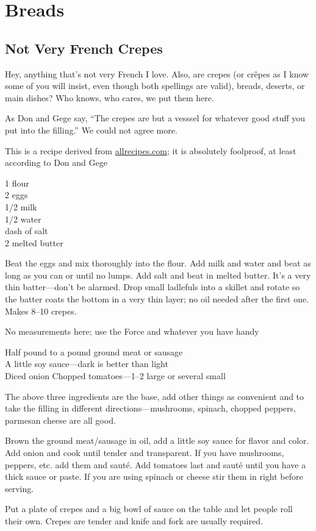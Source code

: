 \chapter{Breads}

\section{Not Very French Crepes}

\begin{open}
    Hey, anything that's not very French I love.  Also, are crepes (or
    cr\^{e}pes as I know some of you will insist, even though both spellings are
    valid), breads, deserts, or main dishes?  Who knows, who cares, we put them
    here.

    As Don and Gege say, ``The crepes are but a vesssel for whatever good stuff
    you put into the filling.''  We could not agree more.

    This is a recipe derived from \url{allrecipes.com}; it is absolutely
    foolproof, at least according to Don and Gege
\end{open}
\begin{ingredients}
    \SI{1}{\cup} flour\\
    2 eggs\\
    \SI{1/2}{\cup} milk\\
    \SI{1/2}{\cup} water\\
    dash of salt\\
    \SI{2}{\tblspoon} melted butter\\
\end{ingredients}
Beat the eggs and mix thoroughly into the flour. Add milk and water and beat as
long as you can or until no lumps. Add salt and beat in melted butter. It's a
very thin batter---don't be alarmed. Drop small ladlefuls into a skillet and
rotate so the batter coats the bottom in a very thin layer; no oil needed after
the first one. Makes \numrange{8}{10} crepes.


\noindent No measurements here; use the Force and whatever you have handy
\begin{ingredients}
    Half pound to a pound ground meat or sausage\\
    A little soy sauce---dark is better than light\\
    Diced onion
    Chopped tomatoes---\numrange{1}{2} large or several small\\
\end{ingredients}
The above three ingredients are the base, add other things as convenient and to take the filling in different directions---mushrooms, spinach, chopped peppers, parmesan cheese are all good.

Brown the ground meat/sausage in oil, add a little soy sauce for flavor and
color. Add onion and cook until tender and transparent. If you have mushrooms,
peppers, etc. add them and saut\'{e}. Add tomatoes last and saut\'{e} until you
have a thick sauce or paste. If you are using spinach or cheese stir them in
right before serving.

Put a plate of crepes and a big bowl of sauce on the table and let people roll
their own. Crepes are tender and knife and fork are usually required.
